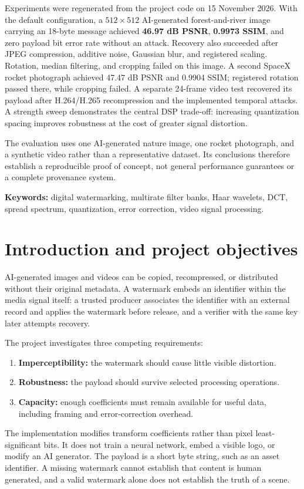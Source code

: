\documentclass[11pt,a4paper]{article}
\begin{document}
Experiments were regenerated from the project code on 15 November 2026. With the
default configuration, a $512\times512$ AI-generated forest-and-river image carrying an 18-byte
message achieved \textbf{46.97 dB PSNR}, \textbf{0.9973 SSIM}, and zero payload bit
error rate without an attack. Recovery also succeeded after JPEG compression,
additive noise, Gaussian blur, and registered scaling. Rotation, median filtering,
and cropping failed on this image. A second SpaceX rocket photograph achieved 47.47 dB PSNR
and 0.9904 SSIM; registered rotation passed there, while cropping failed. A separate
24-frame video test recovered its payload after H.264/H.265 recompression and the
implemented temporal attacks. A strength sweep demonstrates the central DSP
trade-off: increasing quantization spacing improves robustness at the cost of
greater signal distortion.

The evaluation uses one AI-generated nature image, one rocket photograph, and a
synthetic video rather than a representative dataset. Its conclusions therefore
establish a reproducible proof of concept, not general performance guarantees or
a complete provenance system.

\textbf{Keywords:} digital watermarking, multirate filter banks, Haar wavelets,
DCT, spread spectrum, quantization, error correction, video signal processing.
\clearpage
{}

\section{Introduction and project objectives}
AI-generated images and videos can be copied, recompressed, or distributed without
their original metadata. A watermark embeds an identifier within the media signal
itself: a trusted producer associates the identifier with an external record and
applies the watermark before release, and a verifier with the same key later
attempts recovery.

The project investigates three competing requirements:
\begin{enumerate}
\item \textbf{Imperceptibility:} the watermark should cause little visible distortion.
\item \textbf{Robustness:} the payload should survive selected processing operations.
\item \textbf{Capacity:} enough coefficients must remain available for useful data,
including framing and error-correction overhead.
\end{enumerate}
The implementation modifies transform coefficients rather than pixel
least-significant bits. It does not train a neural network, embed a visible logo,
or modify an AI generator. The payload is a short byte string, such as an asset
identifier. A missing watermark cannot establish that content is human generated,
and a valid watermark alone does not establish the truth of a scene.
\end{document}
